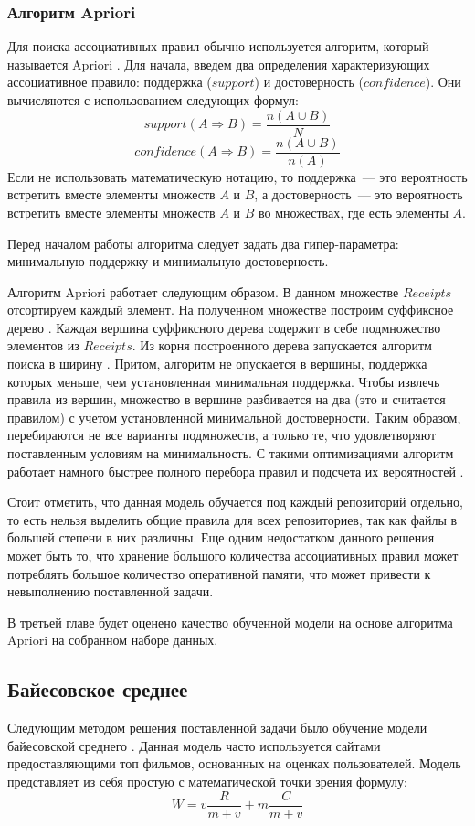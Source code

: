        \subsubsection{Алгоритм Apriori}\label{chapter2-apriori}
Для поиска ассоциативных правил обычно используется алгоритм, который называется Apriori \cite{apriori}. Для начала, введем два определения характеризующих ассоциативное правило: поддержка ($support$) и достоверность ($confidence$). Они вычисляются с использованием следующих формул:
    $$support(A \Rightarrow B) = \frac{n(A \cup B)}{N}$$
    $$confidence(A \Rightarrow B) = \frac{n(A \cup B)}{n(A)}$$
Если не использовать математическую нотацию, то поддержка~--- это вероятность встретить вместе элементы множеств $A$ и $B$, а достоверность~--- это вероятность встретить вместе элементы множеств $A$ и $B$ во множествах, где есть элементы $A$.

Перед началом работы алгоритма следует задать два гипер-параметра: минимальную поддержку и минимальную достоверность. 

Алгоритм Apriori работает следующим образом. В данном множестве $Receipts$ отсортируем каждый элемент. На полученном множестве построим суффиксное дерево \cite{trie}. Каждая вершина суффиксного дерева содержит в себе подмножество элементов из $Receipts$. Из корня построенного дерева запускается алгоритм поиска в ширину \cite{alghorithms}. Притом, алгоритм не опускается в вершины, поддержка которых меньше, чем установленная минимальная поддержка. Чтобы извлечь правила из вершин, множество в вершине разбивается на два (это и считается правилом) с учетом установленной минимальной достоверности. Таким образом, перебираются не все варианты подмножеств, а только те, что удовлетворяют поставленным условиям на минимальность. С такими оптимизациями алгоритм работает намного быстрее полного перебора правил и подсчета их вероятностей \cite{apriori}. 

Стоит отметить, что данная модель обучается под каждый репозиторий отдельно, то есть нельзя выделить общие правила для всех репозиториев, так как файлы в большей степени в них различны. Еще одним недостатком данного решения может быть то, что хранение большого количества ассоциативных правил может потреблять большое количество оперативной памяти, что может привести к невыполнению поставленной задачи.

В третьей главе будет оценено качество обученной модели на основе алгоритма Apriori на собранном наборе данных.
    \subsection{Байесовское среднее}\label{chapter-2-bayes}
Следующим методом решения поставленной задачи было обучение модели байесовской среднего \cite{bayesian-average}. Данная модель часто используется сайтами предоставляющими топ фильмов, основанных на оценках пользователей. Модель представляет из себя простую с математической точки зрения формулу:
    \begin{equation}\label{bayes-formula}
        W = v\frac{R}{m + v} + m\frac{C}{m + v}    
    \end{equation}

